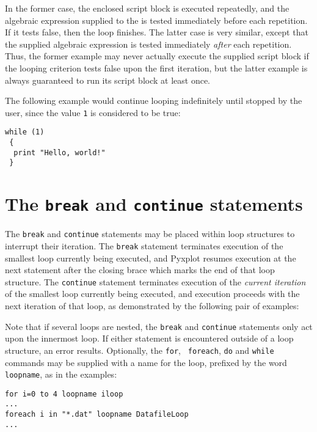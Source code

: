 In the former case, the enclosed script block is executed repeatedly, and the
algebraic expression supplied to the  is tested immediately
before each repetition. If it tests false, then the loop finishes.  The latter
case is very similar, except that the supplied algebraic expression is tested
immediately {\it after} each repetition. Thus, the former example may never
actually execute the supplied script block if the looping criterion tests false
upon the first iteration, but the latter example is always guaranteed to run
its script block at least once.

The following example would continue looping indefinitely until stopped by the
user, since the value {\tt 1} is considered to be true:

\begin{verbatim}
while (1)
 {
  print "Hello, world!"
 }
\end{verbatim}

\section{The {\tt break} and {\tt continue} statements}
\label{sec:breakcontinue}

The {\tt break} and {\tt continue} statements may be placed within loop
structures to interrupt their iteration. The {\tt break} statement terminates
execution of the smallest loop currently being executed, and Pyxplot resumes
execution at the next statement after the closing brace which marks the end of
that loop structure. The {\tt continue} statement terminates execution of the
{\it current iteration} of the smallest loop currently being executed, and
execution proceeds with the next iteration of that loop, as demonstrated by the
following pair of examples:

\vspace{3mm}

\vspace{3mm}

Note that if several loops are nested, the {\tt break} and {\tt continue}
statements only act upon the innermost loop. If either statement is encountered
outside of a loop structure, an error results. Optionally, the {\tt for}, {\tt
foreach}, {\tt do} and {\tt while} commands may be supplied with a name for the
loop, prefixed by the word {\tt loopname}, as in the examples:

\begin{verbatim}
for i=0 to 4 loopname iloop
...
foreach i in "*.dat" loopname DatafileLoop
...
\end{verbatim}

